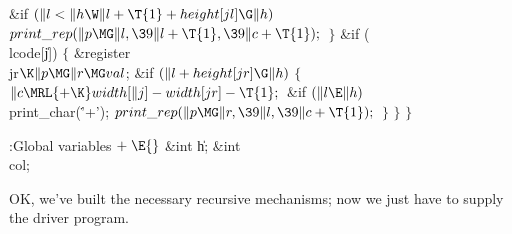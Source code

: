 \&{if} ${}(\|l<\|h\W\|l+\T{1}+\\{height}[\\{jl}]\G\|h){}$\1\5
${}\\{print\_rep}(\|p\MG\|l,\39\|l+\T{1},\39\|c+\T{1});{}$\2\6
\4${}\}{}$\2\6
\&{if} (\\{lcode}[\|j])\5
${}\{{}$\1\6
\&{register} \\{jr}${}\K\|p\MG\|r\MG\\{val}{}$;\7
\&{if} ${}(\|l+\\{height}[\\{jr}]\G\|h){}$\5
${}\{{}$\1\6
${}\|c\MRL{+{\K}}\\{width}[\|j]-\\{width}[\\{jr}]-\T{1};{}$\6
\&{if} ${}(\|l\E\|h){}$\1\5
\\{print\_char}(\.{'+'});\2\6
${}\\{print\_rep}(\|p\MG\|r,\39\|l,\39\|c+\T{1});{}$\6
\4${}\}{}$\2\6
\4${}\}{}$\2\6
\4${}\}{}$\2\par
\fi

\B{}:Global variables\X${}\mathrel+\E{}$\6
\&{int} \|h;\6
\&{int} \\{col};\par
\fi

OK, we've built the necessary recursive mechanisms; now we
just have
to supply the driver program.

